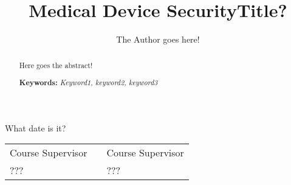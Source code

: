 \documentclass[12pt]{llncs} %
\begin{document}
%
\frontmatter          %
%
\pagestyle{headings}  %
%

\author{The Author goes here!}
\title{Medical Device Security}
\maketitle

\begin{flushright}\noindent
What date is it?
\end{flushright}
\vspace{1cm}

\begin{tabular}{p{4cm}p{4cm}p{4cm}}
Course Supervisor & & Course Supervisor \tabularnewline 
??? & & ??? \tabularnewline 
\end{tabular} 



\vspace{1cm}
\begin{abstract}
Here goes the abstract!\\
\vspace{1cm}
 
\textbf{Keywords: }
\textit{Keyword1, keyword2, keyword3}
\end{abstract}

%
\tableofcontents
%
\mainmatter              %
%
\title{Title?} 
%



\clearpage




\printindex

\pagestyle{empty}


\clearpage

%
\end{document}
